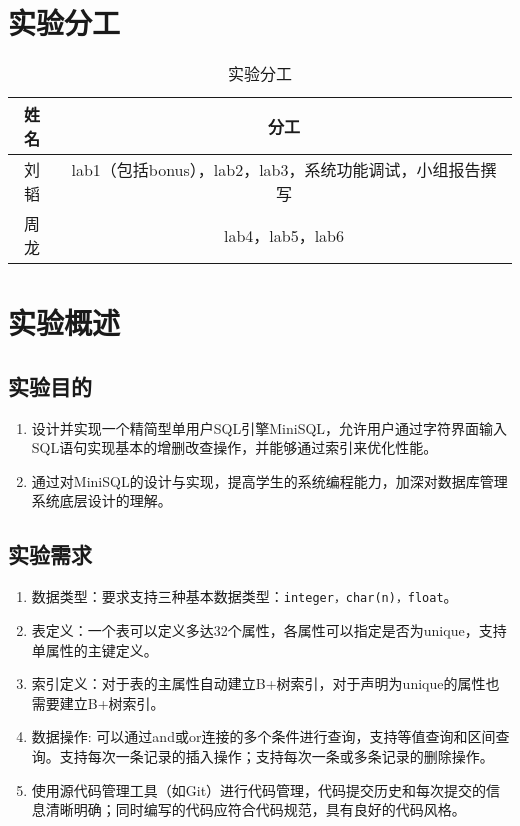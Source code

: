 \documentclass[12pt,hyperref,a4paper,UTF8]{ctexart}
\begin{document}
\cover


\thispagestyle{empty} %

\newpage
\tableofcontents

\newpage

\section{实验分工}

\begin{table}[!htbp]
    \centering
    \begin{tabular}{c|c}
        \hline
        姓名 & 分工 \\
        \hline
        刘韬 & lab1（包括bonus），lab2，lab3，系统功能调试，小组报告撰写 \\
        周龙 & lab4，lab5，lab6 \\
        \hline
    \end{tabular}
    \caption{实验分工}
    \label{table1}
\end{table}

\section{实验概述}
\subsection{实验目的}
\begin{enumerate}
    \item 设计并实现一个精简型单用户SQL引擎MiniSQL，允许用户通过字符界面输入SQL语句实现基本的增删改查操作，并能够通过索引来优化性能。
    \item 通过对MiniSQL的设计与实现，提高学生的系统编程能力，加深对数据库管理系统底层设计的理解。
\end{enumerate}

\subsection{实验需求}
\begin{enumerate}
    \item 数据类型：要求支持三种基本数据类型：\verb|integer，char(n)，float|。
    \item 表定义：一个表可以定义多达32个属性，各属性可以指定是否为unique，支持单属性的主键定义。
    \item 索引定义：对于表的主属性自动建立B+树索引，对于声明为unique的属性也需要建立B+树索引。
    \item 数据操作: 可以通过and或or连接的多个条件进行查询，支持等值查询和区间查询。支持每次一条记录的插入操作；支持每次一条或多条记录的删除操作。
    \item 使用源代码管理工具（如Git）进行代码管理，代码提交历史和每次提交的信息清晰明确；同时编写的代码应符合代码规范，具有良好的代码风格。
\end{enumerate}
\end{document}
